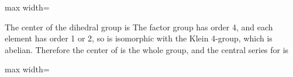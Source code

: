 \documentclass[11pt,oneside]{article}
\begin{document}
\begin{BookBody}
\begin{center}\begin{adjustbox}{max width=\linewidth}\end{adjustbox}\end{center}

\noindent The center of the dihedral group  is  The factor group  has order 4, and each element has order 1 or 2, so  is isomorphic with the Klein 4-group, which is abelian. Therefore the center of  is the whole group, and the central series for  is

\begin{center}\begin{adjustbox}{max width=\linewidth}\end{adjustbox}\end{center} \BookEnd{\blacktriangle}

\end{BookBody}

\BookNarrativefalse
\end{document}
